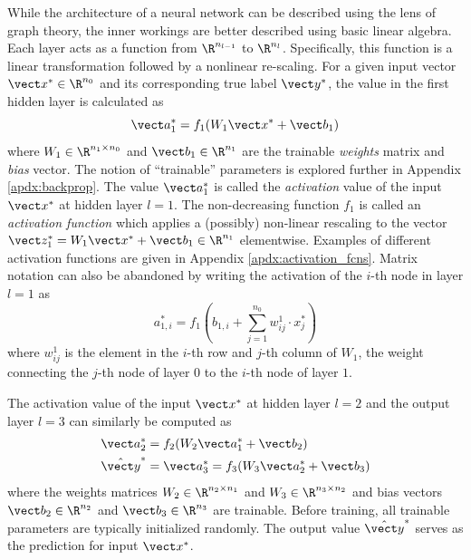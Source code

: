 While the architecture of a neural network can be described using the lens of graph theory, the inner workings are better described using basic linear algebra. Each layer acts as a function from $\R^{n_{l-1}}$ to $\R^{n_{l}}$. Specifically, this function is a linear transformation followed by a nonlinear re-scaling. For a given input vector $\vect x^* \in \R^{n_0}$ and its corresponding true label $\vect y^*$, the value in the first hidden layer is calculated as
\begin{equation}
  \vect a_1^* = f_1(W_1 \vect x^* + \vect b_1)
  \label{eq:hid_layer}
\end{equation}
where $W_1 \in \R^{n_1 \times n_0}$ and $\vect b_1 \in\R^{n_1}$ are the trainable \textit{weights} matrix and \textit{bias} vector. The notion of ``trainable'' parameters is explored further in Appendix \ref{apdx:backprop}. The value $\vect a_1^*$ is called the \textit{activation} value of the input $\vect x^*$ at hidden layer $l=1$. The non-decreasing function $f_1$ is called an \textit{activation function} which applies a (possibly) non-linear rescaling to the vector $\vect z_1^* = W_1 \vect x^* + \vect b_1 \in \R^{n_1}$ elementwise. Examples of different activation functions are given in Appendix \ref{apdx:activation_fcns}. Matrix notation can also be abandoned by writing the activation of the $i$-th node in layer $l=1$ as 
\begin{equation}
  a_{1,i}^* = f_1\left(b_{1,i} + \sum_{j=1}^{n_0} w_{ij}^1 \cdot x_j^* \right)
  \label{eq:element_activation}
\end{equation}
where $w_{ij}^1$ is the element in the $i$-th row and $j$-th column of $W_1$, the weight connecting the $j$-th node of layer $0$ to the $i$-th node of layer $1$.

The activation value of the input $\vect x^*$ at hidden layer $l=2$ and the output layer $l=3$ can similarly be computed as
\begin{equation}
  \begin{split}
    \vect a_2^* &= f_2(W_2 \vect a_1^* + \vect b_2) \\
    \hat{\vect y}^* &= \vect a_3^* = f_3(W_3 \vect a_2^* + \vect b_3)
  \end{split}
  \label{eq:ffn_comp}
\end{equation}
where the weights matrices $W_2 \in \R^{n_2 \times n_1}$ and $W_3 \in \R^{n_3 \times n_2}$ and bias vectors $\vect b_2 \in \R^{n_2}$ and $\vect b_3 \in \R^{n_3}$ are trainable. Before training, all trainable parameters are typically initialized randomly. The output value $\hat{\vect y}^*$ serves as the prediction for input $\vect x^*$. 

